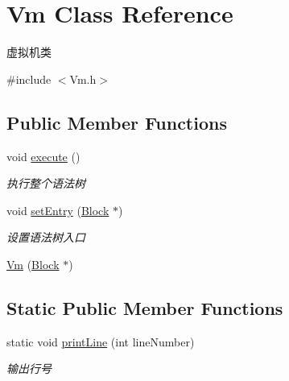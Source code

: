 \hypertarget{class_vm}{}\section{Vm Class Reference}
\label{class_vm}


虚拟机类  




{\ttfamily \#include $<$Vm.\+h$>$}

\subsection*{Public Member Functions}
\begin{DoxyCompactItemize}
\item 
\mbox{\label{class_vm_a37a0791ef2b63e41421446993d0e7e4d}} 
void \hyperlink{class_vm_a37a0791ef2b63e41421446993d0e7e4d}{execute} ()
\begin{DoxyCompactList}\small\item\em 执行整个语法树 \end{DoxyCompactList}\item 
\mbox{\label{class_vm_af036edc52fab207ca28530c06b6d0c67}} 
void \hyperlink{class_vm_af036edc52fab207ca28530c06b6d0c67}{set\+Entry} (\hyperlink{class_block}{Block} $\ast$)
\begin{DoxyCompactList}\small\item\em 设置语法树入口 \end{DoxyCompactList}\item 
\hyperlink{class_vm_a4a37106b5b5b9382baa79dea901db8ba}{Vm} (\hyperlink{class_block}{Block} $\ast$)
\end{DoxyCompactItemize}
\subsection*{Static Public Member Functions}
\begin{DoxyCompactItemize}
\item 
\mbox{\label{class_vm_a376141bb4182218ac7a499043eb18a6c}} 
static void \hyperlink{class_vm_a376141bb4182218ac7a499043eb18a6c}{print\+Line} (int line\+Number)
\begin{DoxyCompactList}\small\item\em 输出行号 \end{DoxyCompactList}\end{DoxyCompactItemize}
